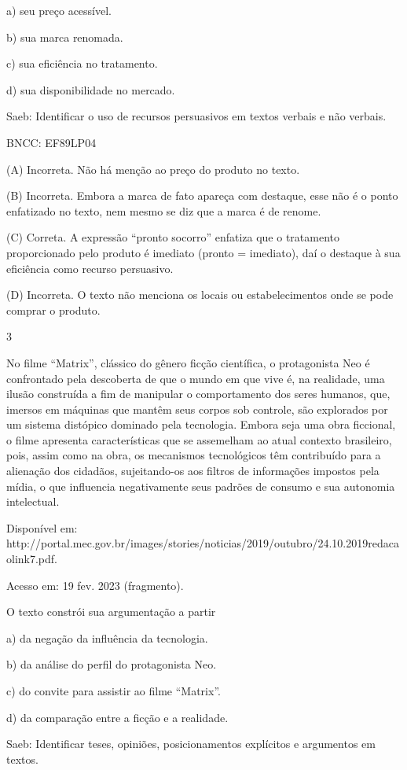 a) seu preço acessível.

b) sua marca renomada.

c) sua eficiência no tratamento.

d) sua disponibilidade no mercado.

Saeb: Identificar o uso de recursos persuasivos em textos verbais e não
verbais.

BNCC: EF89LP04

(A) Incorreta. Não há menção ao preço do produto no texto.

(B) Incorreta. Embora a marca de fato apareça com destaque, esse não é o
ponto enfatizado no texto, nem mesmo se diz que a marca é de renome.

(C) Correta. A expressão ``pronto socorro'' enfatiza que o tratamento
proporcionado pelo produto é imediato (pronto = imediato), daí o
destaque à sua eficiência como recurso persuasivo.

(D) Incorreta. O texto não menciona os locais ou estabelecimentos onde
se pode comprar o produto.

\num{3}

No filme ``Matrix'', clássico do gênero ficção científica, o
protagonista Neo é confrontado pela descoberta de que o mundo em que
vive é, na realidade, uma ilusão construída a fim de manipular o
comportamento dos seres humanos, que, imersos em máquinas que mantêm
seus corpos sob controle, são explorados por um sistema distópico
dominado pela tecnologia. Embora seja uma obra ficcional, o filme
apresenta características que se assemelham ao atual contexto
brasileiro, pois, assim como na obra, os mecanismos tecnológicos têm
contribuído para a alienação dos cidadãos, sujeitando-os aos filtros de
informações impostos pela mídia, o que influencia negativamente seus
padrões de consumo e sua autonomia intelectual.

Disponível em:
http://portal.mec.gov.br/images/stories/noticias/2019/outubro/24.10.2019redacaolink7.pdf.

Acesso em: 19 fev. 2023 (fragmento).

O texto constrói sua argumentação a partir

a) da negação da influência da tecnologia.

b) da análise do perfil do protagonista Neo.

c) do convite para assistir ao filme ``Matrix''.

d) da comparação entre a ficção e a realidade.

Saeb: Identificar teses, opiniões, posicionamentos explícitos e
argumentos em textos.

